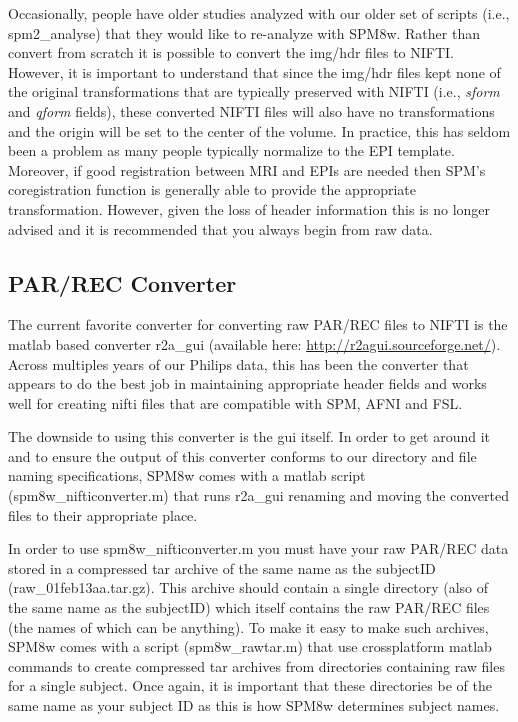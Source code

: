 \documentclass[12pt]{article}
\begin{document}
Occasionally, people have older studies analyzed with our older set of scripts (i.e., \\spm2\_analyse) that they would like to re-analyze with SPM8w. Rather than convert from scratch it is possible to convert the img/hdr files to NIFTI. However, it is important to understand that since the img/hdr files kept none of the original transformations that are typically preserved with NIFTI (i.e., \emph{sform} and \emph{qform} fields), these converted NIFTI files will also have no transformations and the origin will be set to the center of the volume. In practice, this has seldom been a problem as many people typically normalize to the EPI template. Moreover, if good registration between MRI and EPIs are needed then SPM's coregistration function is generally able to provide the appropriate transformation. However, given the loss of header information this is no longer advised and it is recommended that you always begin from raw data. 

\subsection{PAR/REC Converter}
The current favorite converter for converting raw PAR/REC files to NIFTI is the matlab based converter r2a\_gui (available here: \url{http://r2agui.sourceforge.net/}). Across multiples years of our Philips data, this has been the converter that appears to do the best job in maintaining appropriate header fields and works well for creating nifti files that are compatible with  SPM, AFNI and FSL. 

The downside to using this converter is the gui itself. In order to get around it and to ensure the output of this converter conforms to our directory and file naming specifications, SPM8w comes with a matlab script (spm8w\_nifticonverter.m) that runs r2a\_gui renaming and moving the converted files to their appropriate place.  

In order to use spm8w\_nifticonverter.m you must have your raw PAR/REC data stored in a compressed tar archive of the same name as the subjectID (raw\_01feb13aa.tar.gz). This archive should contain a single directory (also of the same name as the subjectID) which itself contains the raw PAR/REC files (the names of which can be anything). To make it easy to make such archives, SPM8w comes with a script (spm8w\_rawtar.m) that use crossplatform matlab commands to create compressed tar archives from directories containing raw files for a single subject. Once again, it is important that these directories be of the same name as your subject ID as this is how SPM8w determines subject names. 
\end{document}
